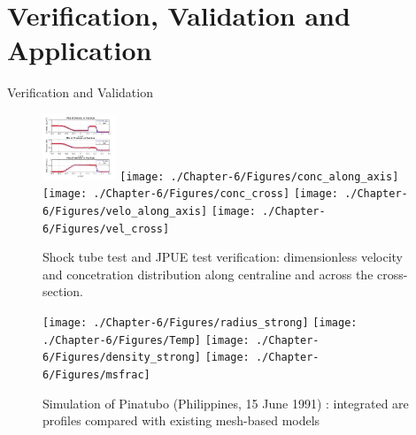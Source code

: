 \documentclass{beamer}
\begin{document}
\section{Verification, Validation and Application}
\begin{frame}{Verification and Validation}
\begin{figure}
\flushleft
\includegraphics[width=0.195\textwidth]{./PPT/shocktube}
\hfill
\texttt{[image: ./Chapter-6/Figures/conc\_along\_axis]}
\hfill
\texttt{[image: ./Chapter-6/Figures/conc\_cross]}
\hfill
\texttt{[image: ./Chapter-6/Figures/velo\_along\_axis]}
\hfill
\texttt{[image: ./Chapter-6/Figures/vel\_cross]}
\caption{Shock tube test and JPUE test verification: dimensionless velocity and concetration distribution along centraline and across the cross-section.}
\label{fig:JPUE_all}
\end{figure}
%
\begin{figure}
\flushleft
\texttt{[image: ./Chapter-6/Figures/radius\_strong]}
\hfill
\texttt{[image: ./Chapter-6/Figures/Temp]}
\hfill
\texttt{[image: ./Chapter-6/Figures/density\_strong]}
\hfill
\texttt{[image: ./Chapter-6/Figures/msfrac]}
\caption{Simulation of Pinatubo (Philippines, 15 June 1991) : integrated are profiles compared with existing mesh-based models}
\label{fig:JPUE_all}
\end{figure}
\end{frame}
\end{document}
